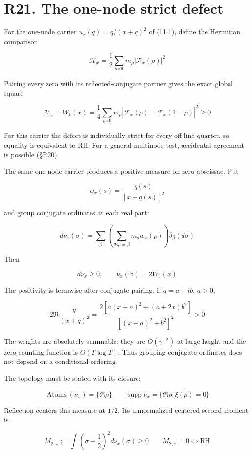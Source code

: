 \documentclass[
  11pt,
]{book}
\begin{document}
\section{R21. The one-node strict
defect}\label{r21.-the-one-node-strict-defect}

For the one-node carrier \(u_x(q)=q/(x+q)^2\) of (11.1), define the
Hermitian comparison

\[
\mathscr H_x
=\frac12\sum_{\rho\ \mathrm{all}}m_\rho
|\mathcal F_x(\rho)|^2
\tag{21.1}
\]

Pairing every zero with its reflected-conjugate partner gives the exact
global square

\[
\boxed{
\mathscr H_x-W_1(x)
=\frac14\sum_{\rho\ \mathrm{all}}m_\rho
\left|\mathcal F_x(\rho)
-\overline{\mathcal F_x(1-\rho)}\right|^2\ge0}
\tag{21.2}
\]

For this carrier the defect is individually strict for every off-line
quartet, so equality is equivalent to RH. For a general multinode test,
accidental agreement is possible (§R20).

The same one-node carrier produces a positive measure on zero abscissae.
Put

\[
w_x(s)=\frac{q(s)}{[x+q(s)]^2}
\tag{21.3}
\]

and group conjugate ordinates at each real part:

\[
d\nu_x(\sigma)=
\sum_\beta\left(
\sum_{\Re\rho=\beta}m_\rho w_x(\rho)
\right)\delta_\beta(d\sigma)
\tag{21.4}
\]

Then

\[
d\nu_x\ge0,\qquad
\nu_x(\mathbb R)=2W_1(x)
\tag{21.5}
\]

The positivity is termwise after conjugate pairing. If \(q=a+ib\),
\(a>0\),

\[
2\Re\frac{q}{(x+q)^2}
=\frac{2[a(x+a)^2+(a+2x)b^2]}{[(x+a)^2+b^2]^2}>0
\tag{21.5a}
\]

The weights are absolutely summable: they are \(O(\gamma^{-2})\) at
large height and the zero-counting function is \(O(T\log T)\). Thus
grouping conjugate ordinates does not depend on a conditional ordering.

The topology must be stated with its closure:

\[
\boxed{
\operatorname{Atoms}(\nu_x)=\{\Re\rho\}
\qquad
\operatorname{supp}\nu_x=
\overline{\{\Re\rho:\xi(\rho)=0\}}}
\tag{21.6}
\]

Reflection centers this measure at \(1/2\). Its unnormalized centered
second moment is

\[
\boxed{
M_{2,x}:=\int\left(\sigma-\frac12\right)^2d\nu_x(\sigma)\ge0
\qquad
M_{2,x}=0\iff\mathrm{RH}}
\tag{21.7}
\]
\end{document}
